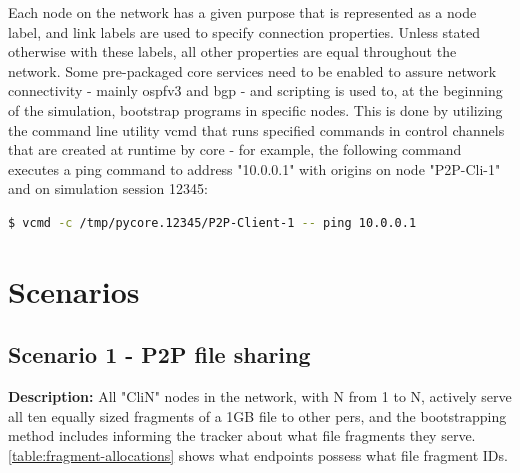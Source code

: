     Each node on the network has a given purpose that is represented as a node label, and link labels are used to specify connection properties.
    Unless stated otherwise with these labels, all other properties are equal throughout the network.
    Some pre-packaged \gls{core} services need to be enabled to assure network connectivity - mainly \gls{ospfv3} and \gls{bgp} - and scripting is used to, at the beginning of the simulation, bootstrap programs in specific nodes.
    This is done by utilizing the command line utility vcmd that runs specified commands in control channels that are created at runtime by \gls{core} - for example, the following command executes a ping command to address "10.0.0.1" with origins on node "P2P-Cli-1" and on simulation session 12345:

    \begin{center}
    \begin{lstlisting}[caption=Execution of an example command through the control channel of a given node, language=bash]
$ vcmd -c /tmp/pycore.12345/P2P-Client-1 -- ping 10.0.0.1
    \end{lstlisting}
    \end{center}

\section{Scenarios}

\subsection{Scenario 1 - P2P file sharing}

\textbf{Description:} All "CliN" nodes in the network, with N from 1 to N, actively serve all ten equally sized fragments of a 1GB file to other pers, and the bootstrapping method includes informing the tracker about what file fragments they serve.
    \ref{table:fragment-allocations} shows what endpoints possess what file fragment IDs.

